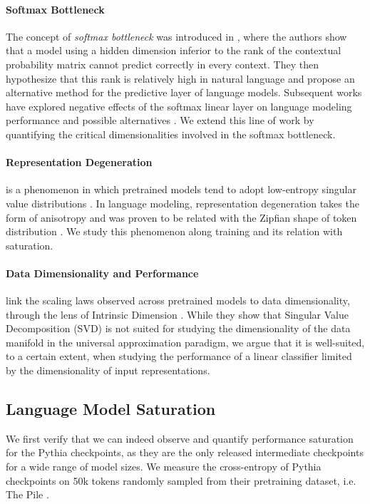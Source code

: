 \paragraph{Softmax Bottleneck} The concept of \textit{softmax bottleneck} was introduced in \citet{softmax_bottleneck}, where the authors show that a model using a hidden dimension inferior to the rank of the contextual probability matrix cannot predict correctly in every context. They then hypothesize that this rank is relatively high in natural language and propose an alternative method for the predictive layer of language models. Subsequent works have explored negative effects of the softmax linear layer on language modeling performance \citep{chang-mccallum-2022-softmax} and possible alternatives \citep{lin2021breaking,sigsoftmax}. We extend this line of work by quantifying the critical dimensionalities involved in the softmax bottleneck.

\paragraph{Representation Degeneration} is a phenomenon in which pretrained models tend to adopt low-entropy singular value distributions \citep{jing2022understanding}. In language modeling, representation degeneration takes the form of anisotropy \citep{ethayarajh-2019-contextual, rajaee-pilehvar-2021-cluster} and was proven to be related with the Zipfian shape of token distribution \citep{gao2018representation,bis-etal-2021-much}. We study this phenomenon along training and its relation with saturation.

\paragraph{Data Dimensionality and Performance} \citet{scaling_manifold} link the scaling laws observed across pretrained models to data dimensionality, through the lens of Intrinsic Dimension \citep{intrinsic_d}. While they show that Singular Value Decomposition (SVD) is not suited for studying the dimensionality of the data manifold in the universal approximation paradigm, we argue that it is well-suited, to a certain extent, when studying the performance of a linear classifier limited by the dimensionality of input representations.


\subsection{Language Model Saturation}
We first verify that we can indeed observe and quantify performance saturation for the Pythia checkpoints, as they are the only released intermediate checkpoints for a wide range of model sizes. We measure the cross-entropy of Pythia checkpoints on 50k tokens randomly sampled from their pretraining dataset, i.e. The Pile \citep{gao2020pile}. 

